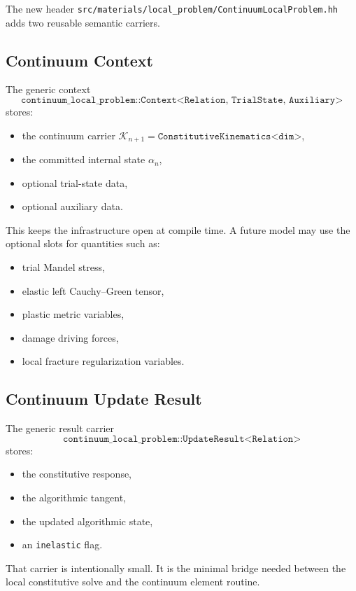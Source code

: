 The new header
\texttt{src/materials/local\_problem/ContinuumLocalProblem.hh}
adds two reusable semantic carriers.

\subsection{Continuum Context}

The generic context
\[
  \texttt{continuum\_local\_problem::Context<Relation, TrialState, Auxiliary>}
\]
stores:
\begin{itemize}
  \item the continuum carrier
        $\mathcal{K}_{n+1} = \texttt{ConstitutiveKinematics<dim>}$,
  \item the committed internal state $\alpha_n$,
  \item optional trial-state data,
  \item optional auxiliary data.
\end{itemize}

This keeps the infrastructure open at compile time.  A future model may use
the optional slots for quantities such as:
\begin{itemize}
  \item trial Mandel stress,
  \item elastic left Cauchy--Green tensor,
  \item plastic metric variables,
  \item damage driving forces,
  \item local fracture regularization variables.
\end{itemize}

\subsection{Continuum Update Result}

The generic result carrier
\[
  \texttt{continuum\_local\_problem::UpdateResult<Relation>}
\]
stores:
\begin{itemize}
  \item the constitutive response,
  \item the algorithmic tangent,
  \item the updated algorithmic state,
  \item an \texttt{inelastic} flag.
\end{itemize}

That carrier is intentionally small.  It is the minimal bridge needed between
the local constitutive solve and the continuum element routine.

